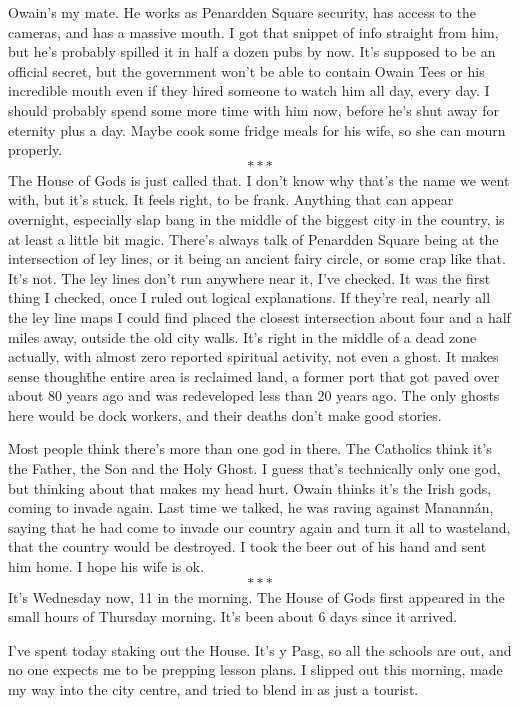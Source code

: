 Owain's my mate. He works as Penardden Square security, has access to
the cameras, and has a massive mouth. I got that snippet of info
straight from him, but he's probably spilled it in half a dozen pubs
by now. It's supposed to be an official secret, but the government
won't be able to contain Owain Tees or his incredible mouth even if
they hired someone to watch him all day, every day. I should probably
spend some more time with him now, before he's shut away for eternity
plus a day. Maybe cook some fridge meals for his wife, so she can
mourn properly.
\nobreak
\[***\]
\nobreak
The House of Gods is just called that. I don't know why that's the
name we went with, but it's stuck. It feels right, to be
frank. Anything that can appear overnight, especially slap bang in the
middle of the biggest city in the country, is at least a little bit
magic. There's always talk of Penardden Square being at the
intersection of ley lines, or it being an ancient fairy circle, or
some crap like that. It's not. The ley lines don't run anywhere near
it, I've checked. It was the first thing I checked, once I ruled out
logical explanations. If they're real, nearly all the ley line maps I
could find placed the closest intersection about four and a half miles
away, outside the old city walls. It's right in the middle of a dead
zone actually, with almost zero reported spiritual activity, not even
a ghost. It makes sense though\=the entire area is reclaimed land, a
former port that got paved over about 80 years ago and was redeveloped
less than 20 years ago. The only ghosts here would be dock workers,
and their deaths don't make good stories.

Most people think there's more than one god in there. The Catholics
think it's the Father, the Son and the Holy Ghost. I guess that's
technically only one god, but thinking about that makes my head
hurt. Owain thinks it's the Irish gods, coming to invade again. Last
time we talked, he was raving against Manannán, saying that he had
come to invade our country again and turn it all to wasteland, that
the country would be destroyed. I took the beer out of his hand and
sent him home. I hope his wife is ok.
\nobreak
\[***\]
\nobreak
It's Wednesday now, 11 in the morning. The House of Gods first
appeared in the small hours of Thursday morning. It's been about 6
days since it arrived.

I've spent today staking out the House. It's y Pasg, so all the
schools are out, and no one expects me to be prepping lesson plans. I
slipped out this morning, made my way into the city centre, and tried
to blend in as just a tourist.

